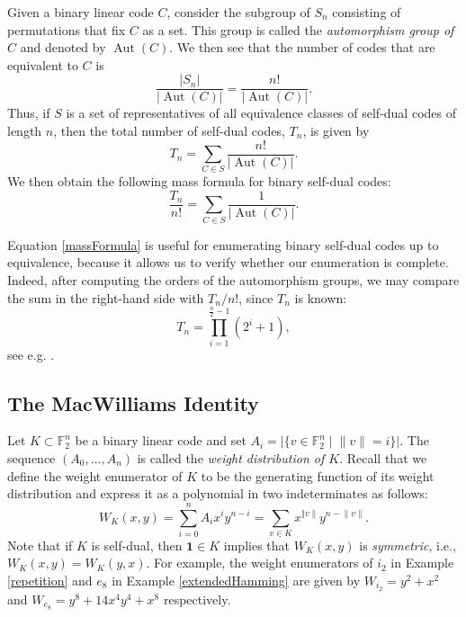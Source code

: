 \documentclass[a4paper,reqno]{amsart}
\DeclareMathOperator{\Aut}{\mathrm{Aut}}%
\theoremstyle{definition}
\theoremstyle{remark} \newtheorem{remark}[theorem]{Remark}
\numberwithin{equation}{section}
\begin{document}
Given a binary linear code \(C\), consider the subgroup of \(S_n\) consisting of permutations that fix \(C\) as a set. This group is called the \emph{automorphism group of \(C\)} and denoted by \(\Aut (C)\). We then see that the number of codes that are equivalent to \(C\) is 
\begin{equation*}
   \frac{\lvert S_n \rvert}{\lvert \Aut (C) \rvert} = \frac{n!}{\lvert \Aut (C) \rvert}.
\end{equation*}
Thus, if \(S\) is a set of representatives of all equivalence classes of self-dual codes of length $n$, then the total number of self-dual codes, \(T_n\), is given by 
\begin{equation*}
    T_n = \sum_{C \in S} \frac{n!}{\lvert \Aut (C) \rvert}.
\end{equation*}
We then obtain the following mass formula for binary self-dual codes:
\begin{equation}\label{massFormula}
    \frac{T_n}{n!} = \sum_{C \in S} \frac{1}{\lvert \Aut (C) \rvert}.
\end{equation}

Equation \eqref{massFormula} is useful for enumerating binary self-dual codes up to equivalence, because it allows us to verify whether our enumeration is complete. Indeed, after computing the orders of the automorphism groups, we may compare the sum in the right-hand side with $T_n/n!$, since $T_n$ is known:
\begin{equation}\label{eq:Tn}
    T_n = \prod_{i=1}^{\frac{n}{2} - 1}(2^i + 1),
\end{equation}
see e.g. \cite[p.~8]{NRS}.

\subsection{The MacWilliams Identity}\label{MWSection} Let \(K \subset \mathbb{F}_2^n\) be a binary linear code and set \(A_i = \lvert \{v \in \mathbb{F}_2^n \mid \lVert v \rVert = i\} \rvert\). The sequence \((A_0, \dots, A_n)\) is called the \emph{weight distribution of \(K\)}. Recall that we define the weight enumerator of \(K\) to be the generating function of its weight distribution and express it as a polynomial in two indeterminates as follows:
\begin{equation*}
    W_K(x,y) = \sum_{i=0}^n A_ix^iy^{n-i} = \sum_{v \in K}x^{\Vert v \rVert}y^{n - \lVert v \rVert}. 
\end{equation*}
Note that if \(K\) is self-dual, then \(\textbf{1} \in K\) implies that \(W_K(x,y)\) is \emph{symmetric}, i.e., \(W_K(x,y) = W_K(y,x)\). For example, the weight enumerators of \(i_2\) in Example \ref{repetition} and \(e_8\) in Example \ref{extendedHamming} are given by \(W_{i_2} = y^2 + x^2\) and \(W_{e_8} = y^8 + 14x^4y^4 + x^8\) respectively.
\end{document}

